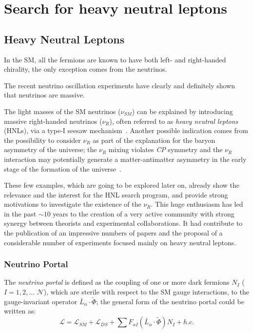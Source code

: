 
\part {Search for heavy neutral leptons}


\chapter{Heavy Neutral Leptons} 
\label{Chapter3} 


In the SM, all the fermions are known to have both left- and right-handed chirality, the only exception comes from the neutrinos.

The recent neutrino oscillation experiments have clearly and
definitely shown that neutrinos are massive.

The light masses of the SM neutrinos ($\nu_{SM}$) can be explained by introducing massive right-handed neutrinos ($\nu_{R}$), often referred to as \emph{heavy neutral leptons} (HNLs), via a type-I seesaw mechanism~\cite{MINKOWSKI1977421,gellmann2013complex,PhysRevLett.44.912,PhysRevD.22.2227}.
Another possible indication comes from the possibility to consider
$\nu_{R}$ as part of the explanation for the baryon asymmetry of the
universe; the $\nu_{R}$ mixing violates \emph{CP} symmetry and the $\nu_{R}$ interaction may potentially generate a matter-antimatter asymmetry in the early stage of the formation of the universe~\cite{Canetti_2012,KUZMIN198536}.

These few examples, which are going to be explored later on, already
show the relevance and the interest for the HNL search program, and
provide strong motivations to investigate the existence of the
$\nu_{R}$. This huge enthusiasm has led in the past $\sim10$ years to
the creation of a very active community with strong synergy between
theorists and experimental collaborations. It had contribute to the publication of an impressive numbers of papers and the proposal of a considerable number of experiments focused mainly on heavy neutral leptons. 

\section{Neutrino Portal} \label{sec:neutrinoPortal}
The \emph{neutrino portal} is defined as the coupling of one or more dark fermions $N_{I}$  ($I = 1,2,...$ $\mathcal{N}$), which are sterile with respect to the SM gauge interactions, to the gauge-invariant operator $\bar{L}_{\alpha}  \cdot \widetilde \Phi$; the general form of the neutrino portal could be written as: 
\begin{equation}
\label{eq:neutrinoportal}
\mathcal{L} = \mathcal{L}_{SM} + \mathcal{L}_{DS} + \sum F_{\alpha I} (\bar{L}_{\alpha}  \cdot \widetilde \Phi)N_{I} + h.c.
\end{equation}

